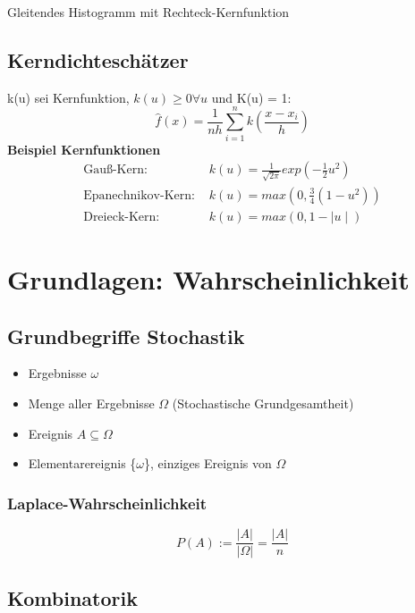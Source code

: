 \documentclass[10pt,a4paper,landscape]{article}
\begin{document}
\begin{multicols}{4}
Gleitendes Histogramm mit Rechteck-Kernfunktion

\subsection{Kerndichteschätzer}
k(u) sei Kernfunktion, $k(u) \geqslant 0 \forall u$ und K(u) = 1:
\[
\hat{f}(x)= \frac{1}{nh}\sum_{i=1}^n k\left(\frac{x-x_i}{h}\right)
\]
\textbf{Beispiel Kernfunktionen}
\begin{align*}
\text{Gauß-Kern: } &k(u)=\frac{1}{\sqrt{2\pi}}exp\left(-\frac{1}{2}u^2\right) \\
\text{Epanechnikov-Kern: } &k(u)=max(0,\frac{3}{4}(1-u^2)) \\
\text{Dreieck-Kern: } &k(u)=max(0,1- \mid u \mid)
\end{align*}


\section{Grundlagen: Wahrscheinlichkeit}

\subsection{Grundbegriffe Stochastik}
\begin{itemize}
\item Ergebnisse $\omega$
\item Menge aller Ergebnisse $\Omega$ (Stochastische Grundgesamtheit)
\item Ereignis $A\subseteq \Omega$
\item Elementarereignis \{$\omega$\}, einziges Ereignis von $\Omega$
\end{itemize}

\subsubsection*{Laplace-Wahrscheinlichkeit}

\[P(A):=\frac{|A|}{|\Omega |}=\frac{|A|}{n}\]

\subsection{Kombinatorik}
\renewcommand{\arraystretch}{0.5} %
\begin{center}
\small %
\end{center}


\end{multicols}
\end{document}
